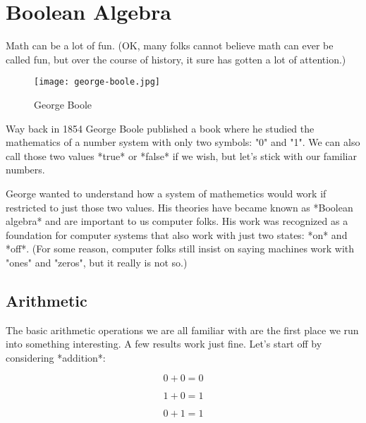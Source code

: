 \chapter{Boolean Algebra}

Math can be a lot of fun. (OK, many folks cannot believe math can ever be called
fun, but over the course of history, it sure has gotten a lot of attention.)


\begin{figure}[ht]
  \caption{George Boole}
  \centering 
  \texttt{[image: george-boole.jpg]}
\end{figure}

Way back in 1854 George Boole published a book \citeauthor{Boole:1854} where he
studied the mathematics of a number system with only two symbols: "0" and "1".
We can also call those two values *true* or *false* if we wish, but let's stick
with our familiar numbers.


George wanted to understand how a system of mathemetics would work if
restricted to just those two values. His theories have became known as *Boolean
algebra* and are important to us computer folks. His work was recognized as a
foundation for computer systems that also work with just two states: *on* and
*off*. (For some reason, computer folks still insist on saying machines work with
"ones" and "zeros", but it really is not so.)

\section{Arithmetic}

The basic arithmetic operations we are all familiar with are the first place we
run into something interesting. A few results work just fine. Let's start off
by considering *addition*:

\begin{equation}
    0 + 0 = 0
\end{equation}

\begin{equation}
    1 + 0 = 1
\end{equation}
    
\begin{equation}
    0 + 1 = 1
\end{equation}

